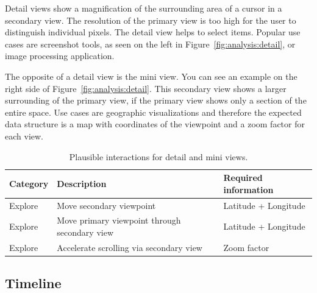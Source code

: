 Detail views show a magnification of the surrounding area of a cursor in a secondary view.
The resolution of the primary view is too high for the user to distinguish individual pixels.
The detail view helps to select items.
Popular use cases are screenshot tools, as seen on the left in Figure~\ref{fig:analysis:detail}, or image processing application.

The opposite of a detail view is the mini view.
You can see an example on the right side of Figure~\ref{fig:analysis:detail}.
This secondary view shows a larger surrounding of the primary view, if the primary view shows only a section of the entire space.
Use cases are geographic visualizations and therefore the expected data structure is a map with coordinates of the viewpoint and a zoom factor for each view.

\begin{table}[H]
  \caption{Plausible interactions for detail and mini views.}%
  \label{fig:analysis:detail:interactions}
  \begin{tabular*}{\textwidth}{lll}
    \bf Category & \bf Description & \bf Required information \\
    \hline
    Explore & Move secondary viewpoint & Latitude + Longitude \\
    Explore & Move primary viewpoint through secondary view & Latitude + Longitude \\
    Explore & Accelerate scrolling via secondary view & Zoom factor \\
  \end{tabular*}
\end{table}

\subsection{Timeline}

